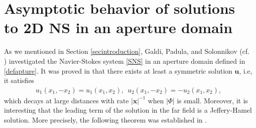 \documentclass[reqno,12pt]{amsart}
\newcommand{\Bv}{{\boldsymbol{v}}}
\newcommand{\Bu}{{\boldsymbol{u}}}
\newcommand{\Bx}{{\boldsymbol{x}}}
\begin{document}
\section{Asymptotic behavior of solutions to  2D NS in an aperture domain}\label{sectionaperturedomain}
As we mentioned in Section \ref{secintroduction}, 
Galdi, Padula, and Solonnikov (cf. \cite{GaldiPadulaSolonnikov96}) investigated the Navier-Stokes system \eqref{SNS} in an aperture domain defined in \eqref{defapture}.
It was proved in \cite{GaldiPadulaSolonnikov96} that there exists at least a symmetric solution $\Bu$, i.e, it satisfies
 \begin{align}
    \label{sym_22}
        u_1(x_1, -x_2)=u_1(x_1, x_2), \ \ u_2(x_1, -x_2)=- u_2 (x_1, x_2), 
    \end{align}
    which 
decays at large distances with rate $|\Bx|^{-1}$ when $|\Phi|$ is small. Moreover, it is interesting that the leading term of the solution in the far field is a Jeffery-Hamel solution. 
More precisely, the following theorem was established in \cite{GaldiPadulaSolonnikov96}. 
\end{document}
